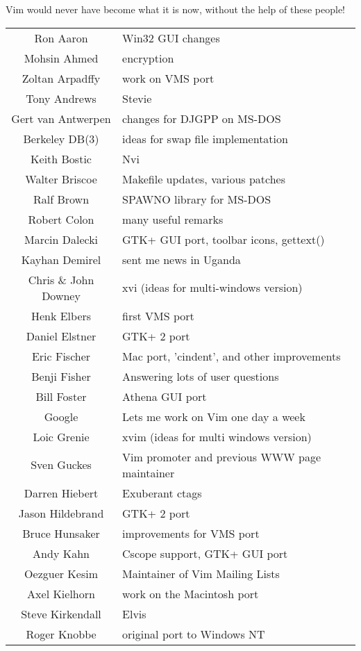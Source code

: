 Vim would never have become what it is now, without the help of these people!
\begin{longtable}{c l}
				Ron Aaron & Win32 GUI changes\\
				Mohsin Ahmed & encryption\\
				Zoltan Arpadffy & work on VMS port\\
				Tony Andrews & Stevie\\
				Gert van Antwerpen & changes for DJGPP on MS-DOS\\
				Berkeley DB(3) & ideas for swap file implementation\\
				Keith Bostic & Nvi\\
				Walter Briscoe & Makefile updates, various patches\\
				Ralf Brown & SPAWNO library for MS-DOS\\
				Robert Colon & many useful remarks\\
				Marcin Dalecki & GTK+ GUI port, toolbar icons, gettext()\\
				Kayhan Demirel & sent me news in Uganda\\
				Chris \& John Downey & xvi (ideas for multi-windows version)\\
				Henk Elbers & first VMS port\\
				Daniel Elstner & GTK+ 2 port\\
				Eric Fischer & Mac port, 'cindent', and other improvements\\
				Benji Fisher & Answering lots of user questions\\
				Bill Foster & Athena GUI port\\
				Google & Lets me work on Vim one day a week\\
				Loic Grenie & xvim (ideas for multi windows version)\\
				Sven Guckes & Vim promoter and previous WWW page maintainer\\
				Darren Hiebert & Exuberant ctags\\
				Jason Hildebrand & GTK+ 2 port\\
				Bruce Hunsaker & improvements for VMS port\\
				Andy Kahn & Cscope support, GTK+ GUI port\\
				Oezguer Kesim & Maintainer of Vim Mailing Lists\\
				Axel Kielhorn & work on the Macintosh port\\
				Steve Kirkendall & Elvis\\
				Roger Knobbe & original port to Windows NT\\

\end{longtable}
